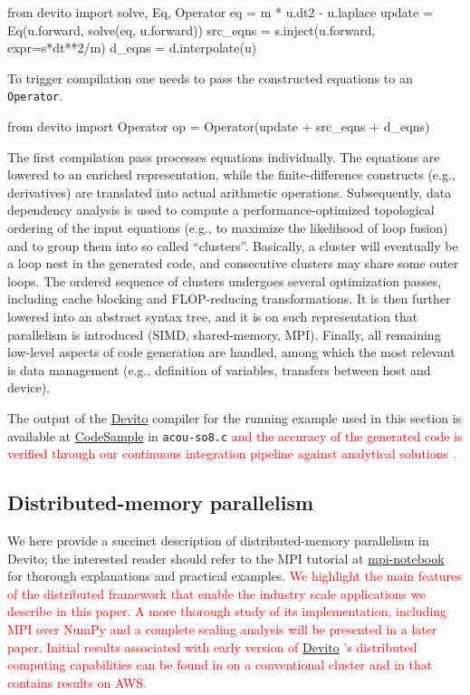 \documentclass[10pt, conference]{IEEEtran}
\newcommand{\devito}{\href{https://github.com/devitocodes/devito}{Devito} }
\begin{document}
\begin{python}[label=WE, caption=Wave-equation symbolic definition]
from devito import solve, Eq, Operator
eq = m * u.dt2 - u.laplace
update = Eq(u.forward, solve(eq, u.forward))
src_eqns = s.inject(u.forward, expr=s*dt**2/m)
d_eqns = d.interpolate(u)
\end{python}

To trigger compilation one needs to pass the constructed equations to an
\texttt{Operator}.

\begin{python}[label=op, caption=Operator creation]
from devito import Operator
op = Operator(update + src_eqns + d_eqns)
\end{python}

The first compilation pass processes equations individually. The
equations are lowered to an enriched representation, while the
finite-difference constructs (e.g., derivatives) are translated into
actual arithmetic operations. Subsequently, data dependency analysis is
used to compute a performance-optimized topological ordering of the
input equations (e.g., to maximize the likelihood of loop fusion) and to
group them into so called ``clusters''. Basically, a cluster will
eventually be a loop nest in the generated code, and consecutive
clusters may share some outer loops. The ordered sequence of clusters
undergoes several optimization passes, including cache blocking and
FLOP-reducing transformations. It is then further lowered into an
abstract syntax tree, and it is on such representation that parallelism
is introduced (SIMD, shared-memory, MPI). Finally, all remaining
low-level aspects of code generation are handled, among which the most
relevant is data management (e.g., definition of variables,
transfers between host and device).

The output of the \devito compiler for the running example used in this
section is available at
\href{https://github.com/mloubout/SC20Paper/tree/master/codesamples}{CodeSample}
in \texttt{acou-so8.c} \textcolor{red}{and the accuracy of the generated code is verified through our
continuous integration pipeline against analytical solutions \cite{devito-api}.}

\subsection{Distributed-memory
parallelism}\label{distributed-memory-parallelism}

We here provide a succinct description of distributed-memory parallelism
in Devito; the interested reader should refer to the MPI tutorial at
\href{https://github.com/devitocodes/devito/blob/v4.2/examples/mpi/overview.ipynb}{mpi-notebook}
for thorough explanations and practical examples.
\textcolor{red}{We highlight the main features of the distributed framework that enable the industry scale
applications we describe in this paper. A more thorough study of its implementation, including MPI over NumPy and
a complete scaling analysis will be presented in a later paper. Initial results associated with early version of \devito's
distributed computing capabilities can be found in \cite{luporini2019adp} on a conventional cluster and 
in \cite{witte2019ecl} that contains results on AWS.}
\end{document}
